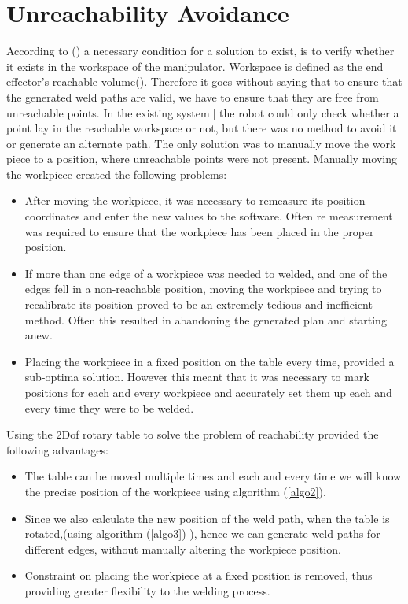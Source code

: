 \section{Unreachability Avoidance}
\localtableofcontents
According to (\citet{craig2005introduction}) a necessary condition for a solution to exist, is to verify whether it exists in the workspace of the manipulator. Workspace is defined as the end effector's reachable volume(\citet{craig2005introduction}). Therefore it goes without saying that to ensure that the generated weld paths are valid, we have to ensure that they are free from unreachable points. In the existing system[\citet{DiazP2016}] the robot could only check whether a point lay in the reachable workspace or not, but there was no method to avoid it or generate an alternate path. The only solution was to manually move the work piece to a position, where unreachable points were not present. Manually moving the workpiece created the following problems:
\begin{itemize}
	\item After moving the workpiece, it was necessary to remeasure its position coordinates and enter the new values to the software. Often re measurement was required to ensure that the workpiece has been placed in the proper position.
	\item If more than one edge of a workpiece was needed to welded, and one of the edges fell in a non-reachable position, moving the workpiece and trying to recalibrate its position proved to be an extremely tedious and inefficient method. Often this resulted in abandoning the generated plan and starting anew.
	\item Placing the workpiece in a fixed position on the table every time, provided a sub-optima solution. However this meant that it was necessary to mark positions for each and every workpiece and accurately set them up each and every time they were to be welded.	
\end{itemize} 

Using the 2Dof rotary table to solve the problem of reachability provided the following advantages:
\begin{itemize}
	\item The table can be moved multiple times and each and every time we will know the precise position of the workpiece using algorithm (\ref{algo2}).
	\item Since we also calculate the new position of the weld path, when the table is rotated,(using algorithm (\ref{algo3}) ), hence we can generate weld paths for different edges, without manually altering the workpiece position.
	\item Constraint on placing the workpiece at a fixed position is removed, thus providing greater flexibility to the welding process.
\end{itemize}
